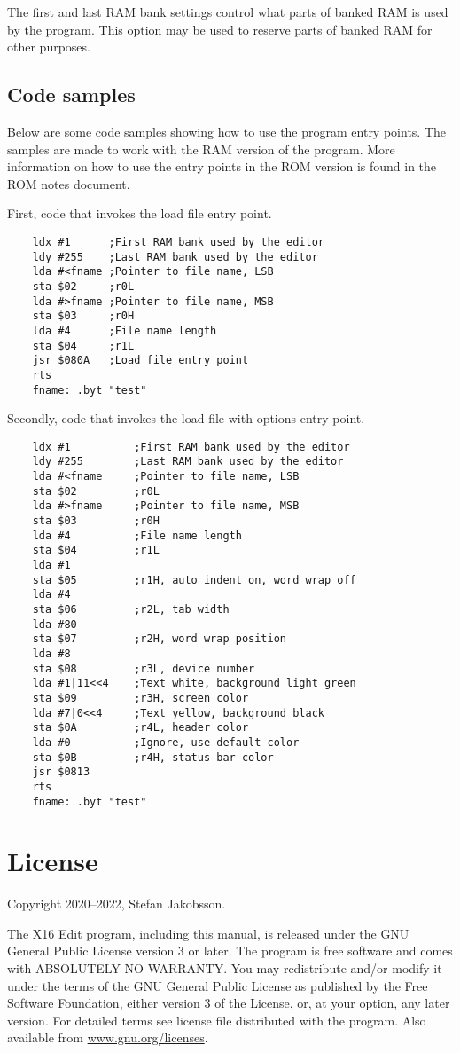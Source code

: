 \documentclass{article}
\begin{document}
        The first and last RAM bank settings control what parts of banked RAM is
        used by the program. This option may be used to reserve parts of banked RAM
        for other purposes.

    \subsection{Code samples}

        Below are some code samples showing how to use the program entry points. The
        samples are made to work with the RAM version of the program. More information
        on how to use the entry points in the ROM version is found in the ROM notes
        document.

        First, code that invokes the load file entry point.

\begin{verbatim}
    ldx #1      ;First RAM bank used by the editor
    ldy #255    ;Last RAM bank used by the editor
    lda #<fname ;Pointer to file name, LSB
    sta $02     ;r0L
    lda #>fname ;Pointer to file name, MSB
    sta $03     ;r0H
    lda #4      ;File name length
    sta $04     ;r1L
    jsr $080A   ;Load file entry point
    rts
    fname: .byt "test"
\end{verbatim}

        Secondly, code that invokes the load file with options entry point.

\begin{verbatim}
    ldx #1          ;First RAM bank used by the editor
    ldy #255        ;Last RAM bank used by the editor
    lda #<fname     ;Pointer to file name, LSB
    sta $02         ;r0L
    lda #>fname     ;Pointer to file name, MSB
    sta $03         ;r0H
    lda #4          ;File name length
    sta $04         ;r1L
    lda #1
    sta $05         ;r1H, auto indent on, word wrap off
    lda #4
    sta $06         ;r2L, tab width
    lda #80
    sta $07         ;r2H, word wrap position
    lda #8
    sta $08         ;r3L, device number
    lda #1|11<<4    ;Text white, background light green
    sta $09         ;r3H, screen color
    lda #7|0<<4     ;Text yellow, background black
    sta $0A         ;r4L, header color
    lda #0          ;Ignore, use default color
    sta $0B         ;r4H, status bar color
    jsr $0813
    rts
    fname: .byt "test"
\end{verbatim}

\section{License}

	Copyright 2020--2022, Stefan Jakobsson.

	The X16 Edit program, including this manual, is released under the GNU General Public License version 3 or later.
    The program is free software and comes with ABSOLUTELY NO WARRANTY. You may redistribute and/or modify it under the 
    terms of the GNU General Public License as pub­lished by the Free Software Foundation, either version 3 of the License, 
    or, at your option, any later version. For detailed terms see license file distributed with the program. 
    Also available from \href{https://www.gnu.org/licenses}{www.gnu.org/licenses}.
\end{document}

